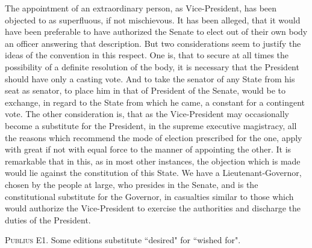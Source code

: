 The appointment of an extraordinary person, as Vice-President, has been objected to as superfluous, if not mischievous. It has been alleged, that it would have been preferable to have authorized the Senate to elect out of their own body an officer answering that description. But two considerations seem to justify the ideas of the convention in this respect. One is, that to secure at all times the possibility of a definite resolution of the body, it is necessary that the President should have only a casting vote. And to take the senator of any State from his seat as senator, to place him in that of President of the Senate, would be to exchange, in regard to the State from which he came, a constant for a contingent vote. The other consideration is, that as the Vice-President may occasionally become a substitute for the President, in the supreme executive magistracy, all the reasons which recommend the mode of election prescribed for the one, apply with great if not with equal force to the manner of appointing the other. It is remarkable that in this, as in most other instances, the objection which is made would lie against the constitution of this State. We have a Lieutenant-Governor, chosen by the people at large, who presides in the Senate, and is the constitutional substitute for the Governor, in casualties similar to those which would authorize the Vice-President to exercise the authorities and discharge the duties of the President.

\vspace{.5cm}
\textsc{Publius}
E1. Some editions substitute ``desired" for ``wished for".

